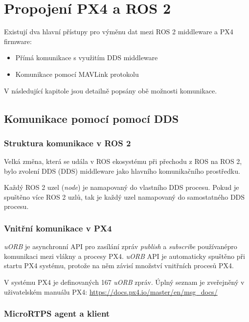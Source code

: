 \chapter{Propojení PX4 a ROS 2}

Existují dva hlavní přístupy pro výměnu dat mezi ROS 2 middleware a PX4 firmware:

\begin{itemize}
    \item Přímá komunikace s využitím \acs{DDS} middleware
    \item Komunikace pomocí MAVLink protokolu\\
\end{itemize}

V následující kapitole jsou detailně popsány obě možnosti komunikace.

\section{Komunikace pomocí pomocí DDS\texorpdfstring{\textsuperscript{\textregistered}}{ (R)}}

\subsection{Struktura komunikace v ROS 2}

Velká změna, která se udála v ROS ekosystému při přechodu z ROS na ROS 2, bylo zvolení \acs{DDS} (\acl{DDS}) middleware jako hlavního komunikačního prostředku.

Každý ROS 2 uzel (\textit{node}) je namapovaný do vlastního \acs{DDS} procesu. Pokud je spuštěno více ROS 2 uzlů, tak je každý uzel namapovaný do samostatného \acs{DDS} procesu. \cite{ROS2DDS3}

\subsection{Vnitřní komunikace v PX4}

\textit{uORB} je asynchronní \acs{API} pro zasílání zpráv \textit{publish} a \textit{subscribe} používané\break pro komunikaci mezi vlákny a procesy PX4. \textit{uORB} \acs{API} je automaticky spuštěno při startu PX4 systému, protože na něm závisí množství vnitřních procesů PX4.

V systému PX4 je definovaných 167 \textit{uORB} zpráv. Úplný seznam je zveřejněný v uživatelském manuálu PX4: \url{https://docs.px4.io/master/en/msg_docs/} \cite{PX4docs}

\subsection{MicroRTPS agent a klient}
\label{sec:komunikace}

